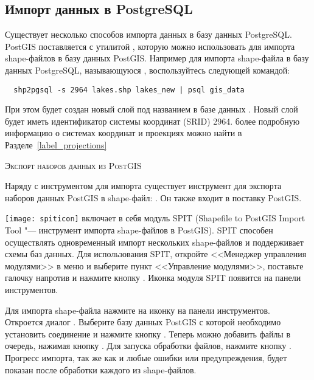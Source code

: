 
\subsection{Импорт данных в PostgreSQL}\label{sec:loading_postgis_data}

Существует несколько способов импорта данных в базу данных PostgreSQL. PostGIS
поставляется с утилитой , которую можно использовать для
импорта shape-файлов в базу данных PostGIS. Например для импорта shape-файла
 в базу данных PostgreSQL, называющуюся
, воспользуйтесь следующей командой:

\begin{verbatim}
  shp2pgsql -s 2964 lakes.shp lakes_new | psql gis_data
\end{verbatim}

При этом будет создан новый слой под названием  в
базе данных . Новый слой будет иметь идентификатор
системы координат (SRID) 2964. более подробную информацию о системах координат
и проекциях можно найти в Разделе~\ref{label_projections}
\begin{Tip}
\caption{\textsc{Экспорт наборов данных из PostGIS}}
Наряду с инструментом для импорта  существует инструмент
для экспорта наборов данных PostGIS в shape-файл: .
Он также входит в поставку PostGIS.
\end{Tip}

\texttt{[image: spiticon]} \qg включает в себя модуль
SPIT (Shapefile to PostGIS Import Tool "--- инструмент импорта shape-файлов
в PostGIS). SPIT способен осуществлять одновременный
импорт нескольких shape-файлов и поддерживает схемы баз данных. Для
использования SPIT, откройте <<Менеджер управления модулями>> \qg в меню
 и выберите пункт <<Управление модулями>>, поставьте
галочку напротив  и нажмите кнопку . Иконка
модуля SPIT появится на панели инструментов.

Для импорта shape-файла нажмите на иконку 
на панели инструментов. \\
Откроется диалог .
Выберите базу данных PostGIS с которой необходимо установить соединение и
нажмите кнопку . Теперь можно добавить файлы в
очередь, нажимая кнопку . Для запуска обработки файлов,
нажмите кнопку . Прогресс импорта, так же как и любые ошибки
или предупреждения, будет показан после обработки каждого из shape-файлов.

